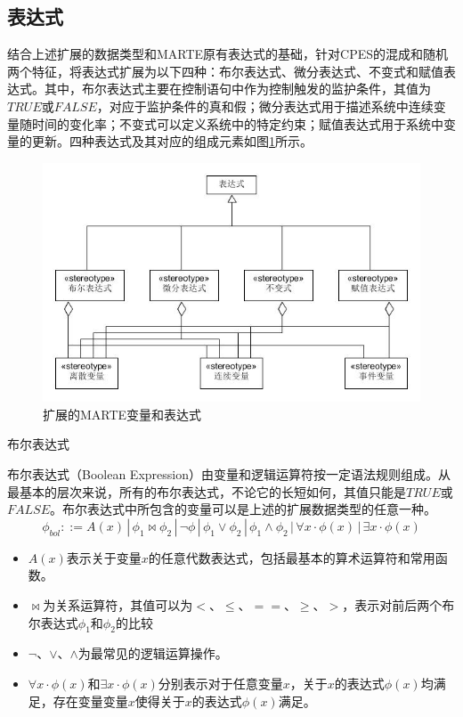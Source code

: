 \subsection{表达式}
	结合上述扩展的数据类型和MARTE原有表达式的基础，针对CPES的混成和随机两个特征，将表达式扩展为以下四种：布尔表达式、微分表达式、不变式和赋值表达式。其中，布尔表达式主要在控制语句中作为控制触发的监护条件，其值为$TRUE$或$FALSE$，对应于监护条件的真和假；微分表达式用于描述系统中连续变量随时间的变化率；不变式可以定义系统中的特定约束；赋值表达式用于系统中变量的更新。四种表达式及其对应的组成元素如图\ref{expression}所示。
	\begin{figure}[!t]
	\centering
	\includegraphics[width=4.8in]{expression.jpg}
	\caption{扩展的MARTE变量和表达式}
	\label{expression}
	\end{figure}
	
	\begin{myDef}布尔表达式\end{myDef}
	布尔表达式（Boolean Expression）由变量和逻辑运算符按一定语法规则组成。从最基本的层次来说，所有的布尔表达式，不论它的长短如何，其值只能是$TRUE$或$FALSE$。布尔表达式中所包含的变量可以是上述的扩展数据类型的任意一种。
	\begin{equation}
	\phi_{bol}::=A(x) \,|\, \phi_{1}\bowtie\phi_{2} \,|\, \neg\phi \,|\, \phi_{1}\vee\phi_{2} \,|\, \phi_{1}\wedge\phi_{2} \,|\, \forall x \cdot \phi(x) \,|\, \exists x \cdot \phi(x)
	\end{equation}

	\begin{itemize}
	\item $A(x)$表示关于变量$x$的任意代数表达式，包括最基本的算术运算符和常用函数。
	\item $\bowtie$为关系运算符，其值可以为$<$、$\leqslant$、$==$、$\geqslant$、$>$，表示对前后两个布尔表达式$\phi_{1}$和$\phi_{2}$的比较
	\item $\neg$、$\vee$、$\wedge$为最常见的逻辑运算操作。
	\item $\forall x  \cdot \phi(x)$和$\exists x  \cdot \phi(x)$分别表示对于任意变量$x$，关于$x$的表达式$\phi(x)$均满足，存在变量变量$x$使得关于$x$的表达式$\phi(x)$满足。
	\end{itemize}
	
